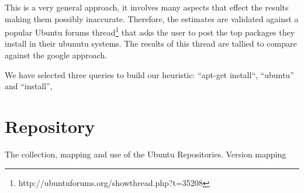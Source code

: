 This is a very general approach, it involves many aspects that effect the results making them possibly inaccurate.
Therefore, the estimates are validated against a popular Ubuntu forums thread\footnote{http://ubuntuforums.org/showthread.php?t=35208} 
that asks the user to post the top packages they install in their ubunutu systems. 
The results of this thread are tallied to compare against the google approach.

We have selected three queries to build our heuristic:
``apt-get install``, ``ubuntu'' and ``install'', 


\section{Repository}
The collection, mapping and use of the Ubuntu Repositories.
Version mapping



